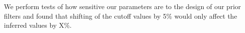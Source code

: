 We perform tests of how sensitive our parameters are to the design of our
prior filters and found that shifting of the cutoff values by 5\% would
only affect the inferred values by X\%. 
